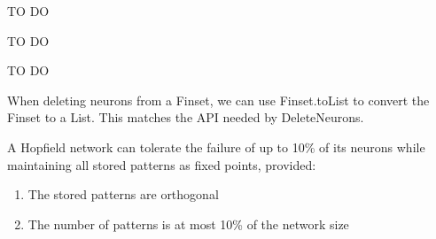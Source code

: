 \begin{lemma}\label{net_input_at_non_deleted_neuron}
TO DO
\end{lemma}

\begin{lemma}\label{product_net_input_activation_at_non_deleted_neuron}
TO DO
\end{lemma}

\begin{definition}\label{non_deleted_neuron_maintains_sign_of_activation}
TO DO
\end{definition}

\begin{definition}\label{DeleteNeurons_with_Finset}
When deleting neurons from a Finset, we can use Finset.toList to convert the Finset to a List.
This matches the API needed by DeleteNeurons.
\end{definition}

\begin{definition}\label{fault_tolerance_bound}
\leanok
A Hopfield network can tolerate the failure of up to 10\% of its neurons
    while maintaining all stored patterns as fixed points, provided:
\begin{enumerate}
\item The stored patterns are orthogonal
\item The number of patterns is at most 10\% of the network size
\end{enumerate}
\end{definition}
